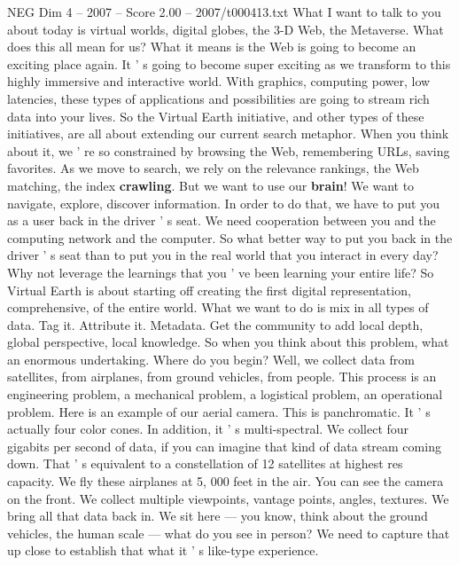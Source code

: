 \begin{textsample}{NEG Dim 4 – 2007 – Score 2.00 – 2007/t000413.txt}  \label{ex:f4_neg_065}
What I want to talk to you about today is virtual worlds, digital globes, the 3-D Web, the Metaverse.
What does this all mean for us?
What it means is the Web is going to become an exciting place again.
It ' s going to become super exciting as we transform to this highly immersive and interactive world.
With graphics, computing power, low latencies, these types of applications and possibilities are going to stream rich data into your lives.
So the Virtual Earth initiative, and other types of these initiatives, are all about extending our current search metaphor.
When you think about it, we ' re so constrained by browsing the Web, remembering URLs, saving favorites.
As we move to search, we rely on the relevance rankings, the Web matching, the index \textbf{crawling}.
But we want to use our \textbf{brain}!
We want to navigate, explore, discover information.
In order to do that, we have to put you as a user back in the driver ' s seat.
We need cooperation between you and the computing network and the computer.
So what better way to put you back in the driver ' s seat than to put you in the real world that you interact in every day?
Why not leverage the learnings that you ' ve been learning your entire life?
So Virtual Earth is about starting off creating the first digital representation, comprehensive, of the entire world.
What we want to do is mix in all types of data.
Tag it.
Attribute it.
Metadata.
Get the community to add local depth, global perspective, local knowledge.
So when you think about this problem, what an enormous undertaking.
Where do you begin?
Well, we collect data from satellites, from airplanes, from ground vehicles, from people.
This process is an engineering problem, a mechanical problem, a logistical problem, an operational problem.
Here is an example of our aerial camera.
This is panchromatic.
It ' s actually four color cones.
In addition, it ' s multi-spectral.
We collect four gigabits per second of data, if you can imagine that kind of data stream coming down.
That ' s equivalent to a constellation of 12 satellites at highest res capacity.
We fly these airplanes at 5, 000 feet in the air.
You can see the camera on the front.
We collect multiple viewpoints, vantage points, angles, textures.
We bring all that data back in.
We sit here — you know, think about the ground vehicles, the human scale — what do you see in person?
We need to capture that up close to establish that what it ' s like-type experience.

\end{textsample}
